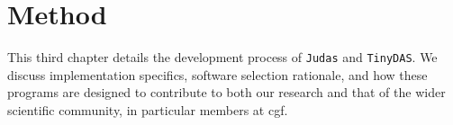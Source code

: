 \chapter{Method}
\label{chap:method}

This third chapter details the development process of \texttt{Judas} and \texttt{TinyDAS}. We discuss implementation specifics, software selection rationale, and how these programs are designed to contribute to both our research and that of the wider scientific community, in particular members at \acrshort{cgf}.









